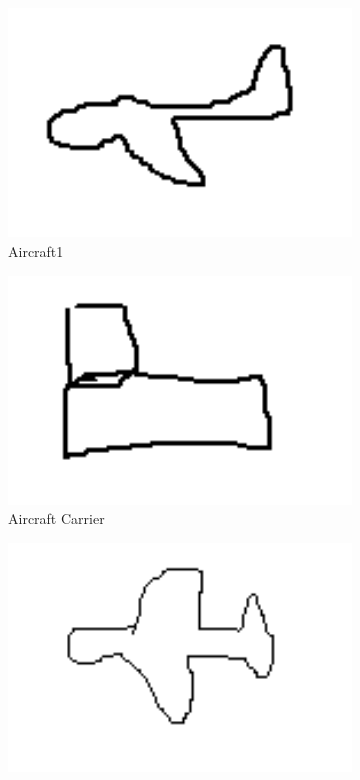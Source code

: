 \documentclass{article}
\begin{document}
\begin{figure}[H]
    \centering
    \begin{subfigure}{.25\textwidth}
      \centering
      \includegraphics[width=1\textwidth]{./img/1.png}
      \caption{Aircraft1}
      \label{fig:Aircraft1}
    \end{subfigure}
    \begin{subfigure}{.25\textwidth}
        \centering
        \includegraphics[width=1\textwidth]{./img/2.png}
        \caption{Aircraft Carrier}
        \label{fig:AircraftCarrier}
    \end{subfigure}
    \begin{subfigure}{.25\textwidth}
        \centering
        \includegraphics[width=1\textwidth]{./img/3.png}

\end{subfigure}
\end{figure}
\end{document}
